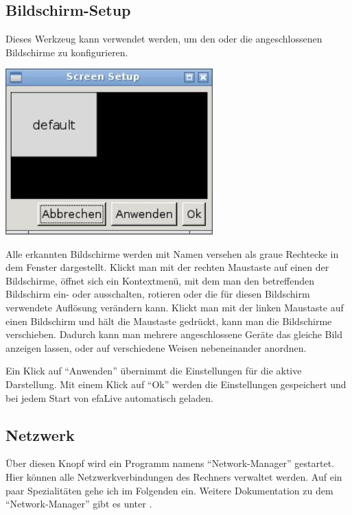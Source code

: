 \documentclass[a4paper,12pt,twoside]{article}
\begin{document}
\subsection{Bildschirm-Setup}
\label{sct:bildschirm}
Dieses Werkzeug kann verwendet werden, um den oder die angeschlossenen
Bildschirme zu konfigurieren.

\begin{minipage}{\linewidth}
    \centering
    \includegraphics[width=8cm]{efaLivede-img/efaLivede-img22.jpg}
    \label{fig:bildschirm}
\end{minipage}
\bigskip

Alle erkannten Bildschirme werden mit Namen versehen als graue Rechtecke
in dem Fenster dargestellt. Klickt man mit der rechten Maustaste auf
einen der Bildschirme, öffnet sich ein Kontextmenü, mit dem man den
betreffenden Bildschirm ein- oder ausschalten, rotieren oder die für
diesen Bildschirm verwendete Auflösung verändern kann. Klickt man mit
der linken Maustaste auf einen Bildschirm und hält die Maustaste
gedrückt, kann man die Bildschirme verschieben. Dadurch kann man
mehrere angeschlossene Geräte das gleiche Bild anzeigen lassen, oder
auf verschiedene Weisen nebeneinander anordnen.

Ein Klick auf "`Anwenden"' übernimmt die
Einstellungen für die aktive Darstellung. Mit einem Klick auf
"`Ok"' werden die Einstellungen gespeichert
und bei jedem Start von efaLive automatisch geladen.


\subsection{Netzwerk}
\label{sct:dialog_netzwerk}
Über diesen Knopf wird ein Programm namens
"`Network-Manager"' gestartet. Hier können
alle Netzwerkverbindungen des Rechners verwaltet werden. Auf ein paar
Spezialitäten gehe ich im Folgenden ein. Weitere Dokumentation zu dem
"`Network-Manager"' gibt es unter \cite{NWM1}.
\end{document}
